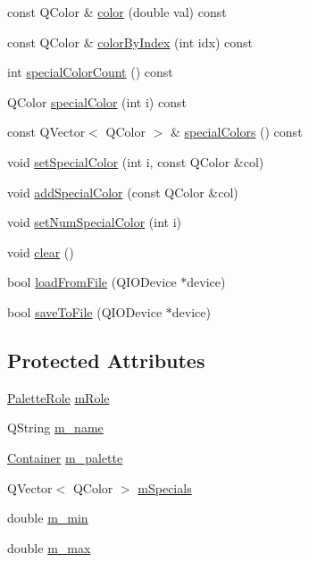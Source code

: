 \begin{DoxyCompactItemize}
const Q\+Color \& \mbox{\hyperlink{class_palette_ab38596e6c853d4f35f597d1dbe834e93}{color}} (double val) const
\item 
const Q\+Color \& \mbox{\hyperlink{class_palette_a8440899b32499c4c1d390bfc94d3fde1}{color\+By\+Index}} (int idx) const
\item 
int \mbox{\hyperlink{class_palette_ae9cbc73610c60e03b5d216fbbe23fbbb}{special\+Color\+Count}} () const
\item 
Q\+Color \mbox{\hyperlink{class_palette_a274b728edcbbe027eb818c93b1a9759f}{special\+Color}} (int i) const
\item 
const Q\+Vector$<$ Q\+Color $>$ \& \mbox{\hyperlink{class_palette_a2e16ef72894b9b21d99c4adab24744c3}{special\+Colors}} () const
\item 
void \mbox{\hyperlink{class_palette_af521d91c1283e5dcf46bc7c7448dc153}{set\+Special\+Color}} (int i, const Q\+Color \&col)
\item 
void \mbox{\hyperlink{class_palette_ae652fdefe115c2b6214901b1ec77b007}{add\+Special\+Color}} (const Q\+Color \&col)
\item 
void \mbox{\hyperlink{class_palette_aba496517b87088f3deea605cf47efbb0}{set\+Num\+Special\+Color}} (int i)
\item 
void \mbox{\hyperlink{class_palette_aabc53a36cbf3e091f2a5f79f52208a45}{clear}} ()
\item 
bool \mbox{\hyperlink{class_palette_a29935a36eedbaf8d9d8b4f34da768ad5}{load\+From\+File}} (Q\+I\+O\+Device $\ast$device)
\item 
bool \mbox{\hyperlink{class_palette_a678521bb829cb9b408983c6c20b34760}{save\+To\+File}} (Q\+I\+O\+Device $\ast$device)
\end{DoxyCompactItemize}
\subsection*{Protected Attributes}
\begin{DoxyCompactItemize}
\item 
\mbox{\hyperlink{palettemanager_8h_adf4610684920d9165d0d74c1ea45b269}{Palette\+Role}} \mbox{\hyperlink{class_palette_a2d05e56292f9d2ea5b05ed51e0f0fc33}{m\+Role}}
\item 
Q\+String \mbox{\hyperlink{class_palette_ab7e31ba2828a1581232403b9d19b5215}{m\+\_\+name}}
\item 
\mbox{\hyperlink{class_palette_a5215559c77b17d9ff9eaec3c0910f759}{Container}} \mbox{\hyperlink{class_palette_a28031bfa1c7c42c09760a74deabf1faf}{m\+\_\+palette}}
\item 
Q\+Vector$<$ Q\+Color $>$ \mbox{\hyperlink{class_palette_ac1b0d344288bd4d35e5bea2a24f8e237}{m\+Specials}}
\item 
double \mbox{\hyperlink{class_palette_a09f596e3b95ca704da47c8e3b964b647}{m\+\_\+min}}
\item 
double \mbox{\hyperlink{class_palette_a4d21ec211e7fd7b0d0d22007fe60e6bd}{m\+\_\+max}}
\end{DoxyCompactItemize}


